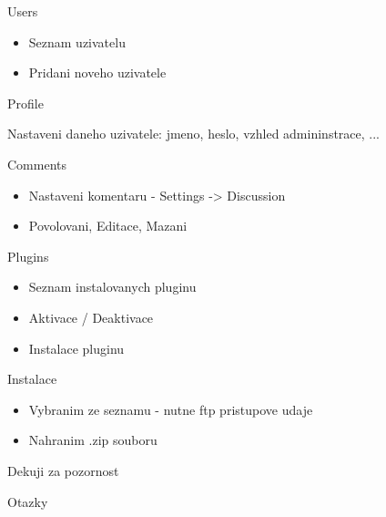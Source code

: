\documentclass{beamer}
\begin{document}
\begin{frame}
    {Users}

    \begin{itemize}
        \item Seznam uzivatelu
        \item Pridani noveho uzivatele
    \end{itemize}
\end{frame}


\begin{frame}
    {Profile}

    Nastaveni daneho uzivatele: jmeno, heslo, vzhled admininstrace, ...
\end{frame}


\begin{frame}
    {Comments}

    \begin{itemize}
        \item Nastaveni komentaru - Settings -> Discussion
        \item Povolovani, Editace, Mazani
    \end{itemize}
\end{frame}


\begin{frame}
    {Plugins}

    \begin{itemize}
        \item Seznam instalovanych pluginu
        \item Aktivace / Deaktivace
        \item Instalace pluginu
    \end{itemize}
\end{frame}


\begin{frame}
    {Instalace}

    \begin{itemize}
        \item Vybranim ze seznamu - nutne ftp pristupove udaje
        \item Nahranim .zip souboru
    \end{itemize}
\end{frame}


\begin{frame}
    {Dekuji za pozornost}

\end{frame}


\begin{frame}
    {Otazky}
\end{frame}
\end{document}
